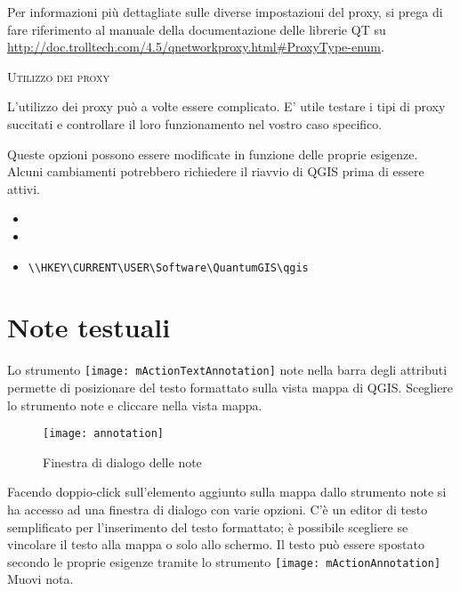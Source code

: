 Per informazioni più dettagliate sulle diverse impostazioni del proxy,
si prega di fare riferimento al manuale della documentazione delle librerie QT su
\url{http://doc.trolltech.com/4.5/qnetworkproxy.html#ProxyType-enum}.

\begin{Tip} \caption{\textsc{Utilizzo dei proxy}}
L'utilizzo dei proxy può a volte essere complicato. E' utile testare i tipi di proxy succitati e controllare il loro funzionamento nel vostro caso specifico.
\end{Tip}

Queste opzioni possono essere modificate in funzione delle proprie esigenze. Alcuni cambiamenti potrebbero richiedere il riavvio di QGIS prima di essere attivi.

\begin{itemize}
\item {}
\item {}
\item {}
\begin{verbatim}
\\HKEY\CURRENT\USER\Software\QuantumGIS\qgis
\end{verbatim}
\end{itemize}

\section{Note testuali}\label{sec:annotations}

Lo strumento \texttt{[image: mActionTextAnnotation]} note nella barra degli attributi permette di 
posizionare del testo formattato sulla vista mappa di QGIS. Scegliere lo strumento note e cliccare nella vista mappa.

\begin{figure}[ht]
   \centering
   \texttt{[image: annotation]}
   \caption{Finestra di dialogo delle note \nixcaption}
   \label{fig:annotation}
\end{figure}

Facendo doppio-click sull'elemento aggiunto sulla mappa dallo strumento note si ha accesso ad una finestra di dialogo con varie opzioni. C'è un editor di testo semplificato per l'inserimento del testo formattato; è possibile scegliere se vincolare il testo alla mappa o solo allo schermo. 
Il testo può essere spostato secondo le proprie esigenze tramite lo strumento \texttt{[image: mActionAnnotation]} {Muovi nota}.

